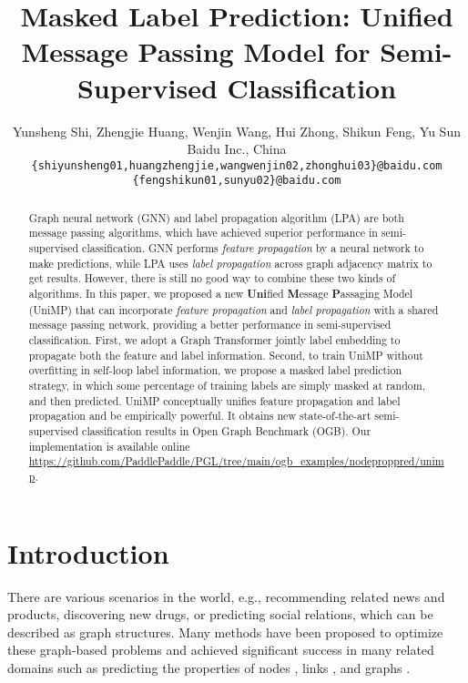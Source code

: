 \documentclass{article} \usepackage{iclr2021_conference,times}
\title{Masked Label Prediction: Unified Message Passing Model for Semi-Supervised Classification}
\author{Yunsheng Shi, Zhengjie Huang, Wenjin Wang, Hui Zhong, Shikun Feng, Yu Sun \\
Baidu Inc., China \\
{\tt \{shiyunsheng01,huangzhengjie,wangwenjin02,zhonghui03\}@baidu.com} \\
{\tt \{fengshikun01,sunyu02\}@baidu.com} \\}
\begin{document}
\maketitle

\begin{abstract}
Graph neural network (GNN) and label propagation algorithm (LPA) are both message passing algorithms, which have achieved superior performance in semi-supervised classification. GNN performs \emph{feature propagation} by a neural network to make predictions, while LPA uses \emph{label propagation} across graph adjacency matrix to get results. However, there is still no good way to combine these two kinds of algorithms. In this paper, we proposed a new {\bf Uni}fied {\bf M}essage {\bf P}assaging Model (UniMP) that can incorporate \emph{feature propagation} and \emph{label propagation} with a shared message passing network, providing a better performance in semi-supervised classification. First, we adopt a Graph Transformer jointly label embedding to propagate both the feature and label information. Second, to train UniMP without overfitting in self-loop label information, we propose a masked label prediction strategy, in which some percentage of training labels are simply masked at random, and then predicted. UniMP conceptually unifies feature propagation and label propagation and be empirically powerful. It obtains new state-of-the-art semi-supervised classification results in Open Graph Benchmark (OGB). Our implementation is available online \url{https://github.com/PaddlePaddle/PGL/tree/main/ogb_examples/nodeproppred/unimp}.
\end{abstract}



\section{Introduction}
There are various scenarios in the world, e.g., recommending related news and products, discovering new drugs, or predicting social relations, 
which can be described as graph structures. Many methods have been proposed to optimize these graph-based problems and achieved significant success in many related domains such as predicting the properties of nodes \citep{yang2016revisiting, kipf2016semi}, links \citep{grover2016node2vec, battaglia2018relational}, and graphs \citep{duvenaud2015convolutional, niepert2016learning, bojchevski2018netgan}.
\end{document}
